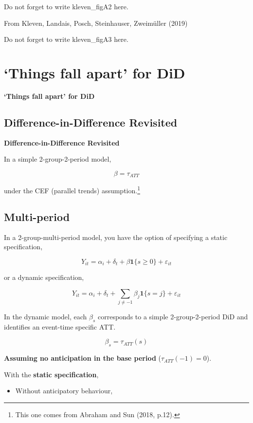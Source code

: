 \documentclass[
  letterpaper,
  DIV=11,
  numbers=noendperiod]{scrreprt}
\providecommand{\tightlist}{%
  \setlength{\itemsep}{0pt}\setlength{\parskip}{0pt}}\usepackage{longtable,booktabs,array}
\theoremstyle{definition}
\theoremstyle{remark}
\begin{document}
Do not forget to write kleven\_figA2 here.

From Kleven, Landais, Posch, Steinhauser, Zweimüller (2019)

Do not forget to write kleven\_figA3 here.

\hypertarget{things-fall-apart-for-did}{%
\chapter{`Things fall apart' for DiD}\label{things-fall-apart-for-did}}

\textbf{`Things fall apart' for DiD}

\hypertarget{difference-in-difference-revisited}{%
\section{Difference-in-Difference
Revisited}\label{difference-in-difference-revisited}}

\textbf{Difference-in-Difference Revisited}

In a simple 2-group-2-period model,

\[
\beta = \tau_{ATT}
\]

under the CEF (parallel trends) assumption.\footnote{This one comes from
  Abraham and Sun (2018, p.12).}

\hypertarget{multi-period}{%
\section{Multi-period}\label{multi-period}}

In a 2-group-multi-period model, you have the option of specifying a
static specification,

\[
Y_{it} = \alpha_i + \delta_t + \beta \mathbf{1}\{s\geq 0\} + \varepsilon_{it}
\]

or a dynamic specification,

\[
Y_{it} = \alpha_i + \delta_t + \sum_{j\neq-1}\beta_j \mathbf{1}\{s=j\} + \varepsilon_{it}
\]

In the dynamic model, each \(\beta_s\) corresponds to a simple
2-group-2-period DiD and identifies an event-time specific ATT.

\[
\beta_s = \tau_{ATT}(s)
\]

\textbf{Assuming no anticipation in the base period}
(\(\tau_{ATT}(-1)=0\)).

With the \textbf{static specification},

\begin{itemize}
\tightlist
\item
  Without anticipatory behaviour,
\end{itemize}
\end{document}
